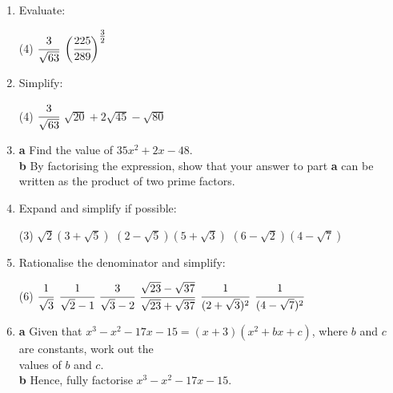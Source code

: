 \documentclass[fleqn]{article}
\begin{document}
\begin{enumerate}
	\item Evaluate: \vspace{-2mm}
		\begin{tasks}(4) %
			\task $\cfrac{3}{\sqrt{63}}$
			\task $\bigg(\cfrac{225}{289}\bigg)^{\textstyle\frac{3}{2}}$
		\end{tasks}
	\item Simplify: \vspace{-2mm} %
		\begin{tasks}(4)
			\task $\cfrac{3}{\sqrt{63}}$				%
			\task $\sqrt{20}+2\sqrt{45}-\sqrt{80}$	%
		\end{tasks}
	\item \hspace*{2mm}\textbf{a}\hspace*{5mm} Find the value of $35x^2+2x-48$.\vspace{1mm}\\
		  \hspace*{2mm}\textbf{b}\hspace*{5mm} By factorising the expression, show that your answer to part \textbf{a} can be written as the product of two \linebreak\hspace*{10.5mm}prime factors.
	\item Expand and simplify if possible:
		\begin{tasks}(3) %
			\task $\sqrt{2}(3+\sqrt{5})$
			\task $(2-\sqrt{5})(5+\sqrt{3})$
			\task $(6-\sqrt{2})(4-\sqrt{7})$
		\end{tasks}
	\item Rationalise the denominator and simplify: \vspace{-2mm}
	\begin{tasks}(6) %
			\task $\cfrac{1}{\sqrt{3}}$
			\task $\cfrac{1}{\sqrt{2}-1}$
			\task $\cfrac{3}{\sqrt{3}-2}$
			\task $\cfrac{\sqrt{23}-\sqrt{37}}{\sqrt{23}+\sqrt{37}}$
			\task $\cfrac{1}{(2+\sqrt{3})^2}$
			\task $\cfrac{1}{(4-\sqrt{7})^2}$
		\end{tasks}
	\item \hspace*{2mm}\textbf{a}\hspace*{5mm} Given that $x^3-x^2-17x-15=(x+3)(x^2+bx+c)$, where $b$ and $c$ are constants, work out the \\\hspace*{9mm} values of $b$ and $c$.\vspace{1mm}\\
		  \hspace*{2mm}\textbf{b}\hspace*{5mm} Hence, fully factorise $x^3-x^2-17x-15$.
	\newpage


\end{enumerate}
\end{document}
